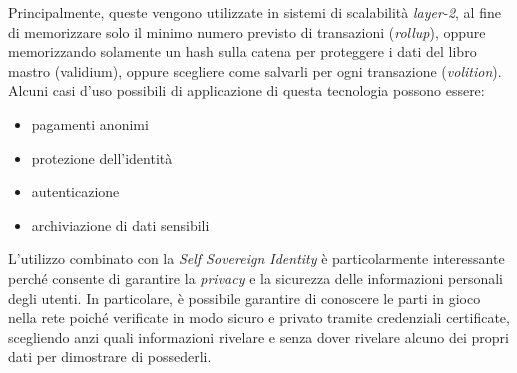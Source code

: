 Principalmente, queste vengono utilizzate in sistemi di scalabilità \textit{layer-2}, al fine di memorizzare solo il minimo numero previsto di transazioni (\textit{rollup}),
oppure memorizzando solamente un hash sulla catena per proteggere i dati del libro mastro (validium), oppure scegliere come salvarli per ogni transazione (\textit{volition}).
Alcuni casi d'uso possibili di applicazione di questa tecnologia possono essere:
\begin{itemize}
    \item{pagamenti anonimi}
    \item{protezione dell'identità}
    \item{autenticazione}
    \item{archiviazione di dati sensibili}
\end{itemize}

L'utilizzo combinato con la \textit{Self Sovereign Identity} è particolarmente interessante perché consente di garantire la \textit{privacy} e la sicurezza delle informazioni personali degli utenti.
In particolare, è possibile garantire di conoscere le parti in gioco nella rete poiché verificate
in modo sicuro e privato tramite credenziali certificate, scegliendo anzi quali informazioni rivelare e senza
dover rivelare alcuno dei propri dati per dimostrare di possederli. 